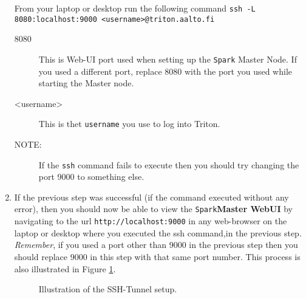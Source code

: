 \documentclass[a4paper,11pt]{article}
\begin{document}
\begin{enumerate}
	From your laptop or desktop run the following command \texttt{ssh -L 8080:localhost:9000 <username>@triton.aalto.fi}
	\begin{description}
		\item[8080] This is Web-UI port used when setting up the \texttt{Spark} Master Node. If you used a different port, replace 8080 with the port you used while starting the Master node.
		\item[<username>] This is thet \texttt{username} you use to log into Triton.
		\item[NOTE:] If the \texttt{ssh} command fails to execute then you should try changing the port 9000 to something else. 
	\end{description}
	\item If the previous step was successful (if the command executed without any error), then you should now be able to view the \texttt{Spark}\textbf{Master WebUI} by navigating to the url \texttt{http://localhost:9000} in any web-browser on the laptop or desktop where you executed the ssh command,in the previous step. \textit{Remember}, if you used a port other than 9000 in the previous step then you should replace 9000 in this step with that same port number.
	This process is also illustrated in Figure \ref{fig:tunnel}.
	\begin{figure}[ht!]
		\centering
		\caption{Illustration of the SSH-Tunnel setup.}
		\label{fig:tunnel}
	\end{figure}
	

\end{enumerate}
\end{document}
